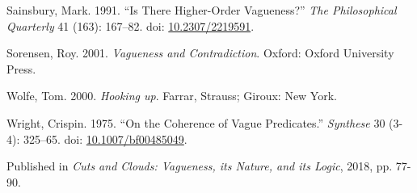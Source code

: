 \documentclass[
  10pt,
  letterpaper,
  DIV=11,
  numbers=noendperiod,
  twoside]{scrartcl}
\newlength{\cslhangindent}
\newenvironment{CSLReferences}[2] %
 {\begin{list}{}{%
  \setlength{\itemindent}{0pt}
  \setlength{\leftmargin}{0pt}
  \setlength{\parsep}{0pt}
  \ifodd #1
   \setlength{\leftmargin}{\cslhangindent}
   \setlength{\itemindent}{-1\cslhangindent}
  \fi
  \setlength{\itemsep}{#2\baselineskip}}}
 {\end{list}}
\begin{document}
\begin{CSLReferences}{1}{0}
Sainsbury, Mark. 1991. {``Is There Higher-Order Vagueness?''} \emph{The
Philosophical Quarterly} 41 (163): 167--82. doi:
\href{https://doi.org/10.2307/2219591}{10.2307/2219591}.

Sorensen, Roy. 2001. \emph{Vagueness and Contradiction}. Oxford: Oxford
University Press.

Wolfe, Tom. 2000. \emph{Hooking up}. Farrar, Strauss; Giroux: New York.

Wright, Crispin. 1975. {``On the Coherence of Vague Predicates.''}
\emph{Synthese} 30 (3-4): 325--65. doi:
\href{https://doi.org/10.1007/bf00485049}{10.1007/bf00485049}.

\end{CSLReferences}



\noindent Published in\emph{
Cuts and Clouds: Vagueness, its Nature, and its Logic}, 2018, pp. 77-90.
\end{document}
